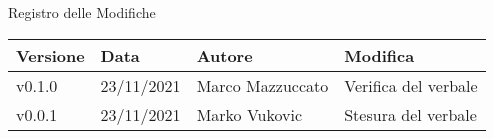 \begin{center}
  \huge{Registro delle Modifiche}
\end{center}

\begin{center}
  \begin{tabular}{|p{2cm}|p{2cm}|p{3cm}|p{5cm}|}
    \hline
    \textbf{Versione} & \textbf{Data} & \textbf{Autore} & \textbf{Modifica}                    \\ \hline
    v0.1.0            & 23/11/2021    & Marco Mazzuccato   & Verifica del verbale \\ \hline
    v0.0.1            & 23/11/2021    & Marko Vukovic   & Stesura del verbale \\ \hline
  \end{tabular}
\end{center}
